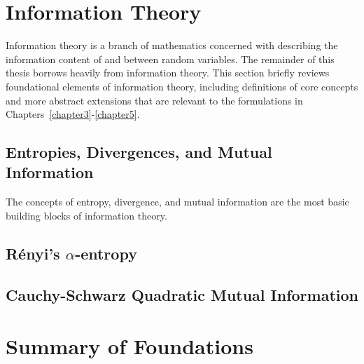 \section{Information Theory}
\label{sec:information_theory}

Information theory is a branch of
mathematics concerned with describing the information content of and between random
variables. The remainder of this thesis borrows heavily from information theory. This section briefly
reviews foundational elements of information theory, including definitions of core concepts and
more abstract extensions that are relevant to the formulations in
Chapters~\ref{chapter3}-\ref{chapter5}.

\subsection{Entropies, Divergences, and Mutual Information}

The concepts of entropy, divergence, and mutual information are the most basic building
blocks of information theory.

\subsection{R\'{e}nyi's $\alpha$-entropy}

\subsection{Cauchy-Schwarz Quadratic Mutual Information}

\section{Summary of Foundations}
